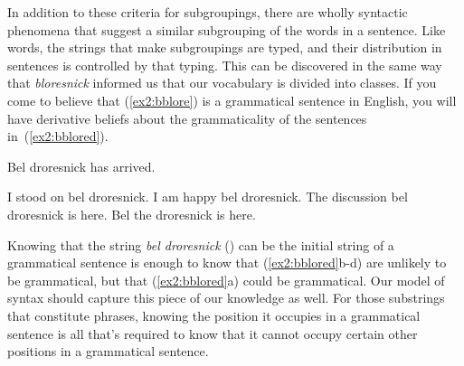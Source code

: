 In addition to these criteria for subgroupings, there are wholly syntactic phenomena that suggest a similar subgrouping of the words in a sentence. Like words, the strings that make subgroupings are typed, and their distribution in sentences is controlled by that typing. This can be discovered in the same way that \emph{bloresnick} informed us that our vocabulary is divided into classes. If you come to believe that (\ref{ex2:bblore}) is a grammatical sentence in English, you will have derivative beliefs about the grammaticality of the sentences in~(\ref{ex2:bblored}).
\begin{exe}
	\raggedright
	\ex \label{ex2:bblore} 
	Bel droresnick has arrived.
	\ex \label{ex2:bblored}
	\begin{xlist}
		\ex I stood on bel droresnick.
		\ex I am happy bel droresnick.
		\ex The discussion bel droresnick is here.
		\ex Bel the droresnick is here.
	\end{xlist}
\end{exe} 
Knowing that the string \emph{bel droresnick} () can be the initial string of a grammatical sentence is enough to know that (\ref{ex2:bblored}b-d) are unlikely to be grammatical, but that (\ref{ex2:bblored}a) could be grammatical. Our model of syntax should capture this piece of our knowledge as well. For those substrings that constitute phrases, knowing the position it occupies in a grammatical sentence is all that's required to know that it cannot occupy certain other positions in a grammatical sentence.

